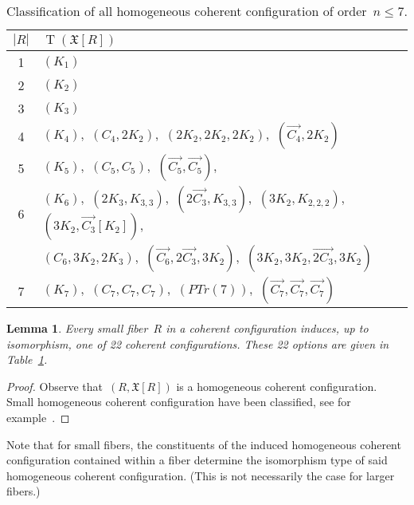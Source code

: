\documentclass[english,a4paper]{article}
\theoremstyle{plain}
\newtheorem{lemma}      [theorem]{Lemma}
\theoremstyle{definition}
\newcommand{\abs}[1]{| #1 |}
\newcommand{\coherentConfig}{\ensuremath{\mathfrak{X}}}
\newcommand{\inducedCC}[1]{\ensuremath{\coherentConfig[#1]}}
\DeclareMathOperator*{\Type}{T}
\newcommand{\type}[1]{\ensuremath{\Type\left(#1\right)}}
\begin{document}
\begin{table}
    \centering{}\begin{tabular}{|c|l|}
        \hline
        $\abs{R}$ & $\type{\inducedCC{R}}$ \\ \hline
        1 & $(K_1)$\\ \hline
        2 & $(K_2)$\\ \hline
        3 & $(K_3)$\\ \hline
        4 & $(K_4)$,~$(C_4,2K_2)$,~$(2K_2,2K_2,2K_2)$,~$(\overrightarrow{C_4},2K_2)$\\ \hline
        5 & $(K_5)$,~$(C_5,C_5)$,~$(\overrightarrow{C_5},\overrightarrow{C_5})$, \\ \hline
        6 & $(K_6)$,~$(2 K_3,K_{3,3})$,~$(2\overrightarrow{C_3},K_{3,3})$,~$(3 K_2,K_{2,2,2})$,~$(3K_2,\overrightarrow{C_3}[K_2])$,\\
            & $(C_6,3K_2,2K_3)$,~$(\overrightarrow{C_6},2\overrightarrow{C_3},3K_2)$,~$(3K_2,3K_2,\overrightarrow{2C_3},3K_2)$\\ \hline
        7 & $(K_7)$,~$(C_7,C_7,C_7)$,~$(PTr(7))$,~$(\overrightarrow{C_7},\overrightarrow{C_7},\overrightarrow{C_7})$ \\ \hline
    \end{tabular}
    \caption{Classification of all homogeneous coherent configuration of order~$n \leq 7$.}
    \label{small-cc:classificaiton-small-cc/tab}
\end{table}
 

\begin{lemma}
\label{small-cc:induced-cc/lem} \label{small-cc:implied-cc/lem}
    Every small fiber~$R$ in a coherent configuration induces, up to isomorphism, one of 22 coherent configurations. These 22 options are given in Table~\ref{small-cc:classificaiton-small-cc/tab}.
\end{lemma}
\begin{proof}
    Observe that~$(R,\inducedCC{R})$ is a homogeneous coherent configuration.
    Small homogeneous coherent configuration have been classified, see for example~\cite{MiyamotoHanaki2000,DBLP:journals/dm/HanakiM03}.
\end{proof}


Note that for small fibers, the constituents of the induced homogeneous coherent configuration contained within a fiber determine the isomorphism type of said homogeneous coherent configuration.
(This is not necessarily the case for larger fibers.)
\end{document}
